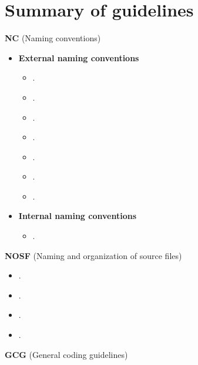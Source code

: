 %
\section{Summary of guidelines}
\label{sec:summary_guidelines}
%

\noindent\textbf{NC} (Naming conventions)

  \setcounter{Thyra_NC_counter}{0}

  \begin{itemize}
  {}\item\textbf{External naming conventions}
    \begin{itemize}
    {}\item\NCClassNames.
    {}\item\NCNamespaceNames.
    {}\item\NCEnumNames.
    {}\item\NCObjectNames.
    {}\item\NCFunctionNames.
    {}\item\NCBaseDefaultClassNames.
    {}\item\NCConstNonconstAccessFunctionName.
    \end{itemize}
  {}\item\textbf{Internal naming conventions}
    \begin{itemize}
    {}\item\NCDataMemberNames.
    \end{itemize}
  \end{itemize}

\noindent\textbf{NOSF} (Naming and organization of source files)

  \setcounter{Thyra_NOSF_counter}{0}

  \begin{itemize}
  {}\item\NOSFFileExtension.
  {}\item\NOSFClassFiles.
  {}\item\NOSFIncludeGuards.
  {}\item\NOSFCopyrightHeaders.
  \end{itemize}

\noindent\textbf{GCG} (General coding guidelines)

  \setcounter{Thyra_GCG_counter}{0}

